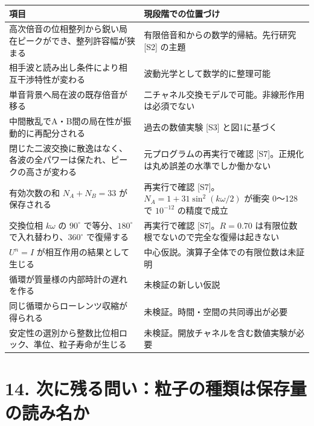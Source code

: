 \documentclass[
  a4paper,
]{ltjsarticle}
\newcounter{none} %
\begin{document}
{\def\LTcaptype{none} %
\begin{longtable}[]{@{}
  >{\raggedright\arraybackslash}p{}
  >{\raggedright\arraybackslash}p{}@{}}
\toprule\noalign{}
\begin{minipage}[b]{\linewidth}\raggedright
項目
\end{minipage} & \begin{minipage}[b]{\linewidth}\raggedright
現段階での位置づけ
\end{minipage} \\
\midrule\noalign{}
\endhead
\bottomrule\noalign{}
\endlastfoot
高次倍音の位相整列から鋭い局在ピークができ、整列許容幅が狭まる &
有限倍音和からの数学的帰結。先行研究 {[}S2{]} の主題 \\
相手波と読み出し条件により相互干渉特性が変わる &
波動光学として数学的に整理可能 \\
単音背景へ局在波の既存倍音が移る &
二チャネル交換モデルで可能。非線形作用は必須でない \\
中間散乱でA・B間の局在性が振動的に再配分される & 過去の数値実験 {[}S3{]}
と図1に基づく \\
閉じた二波交換に散逸はなく、各波の全パワーは保たれ、ピークの高さが変わる
& 元プログラムの再実行で確認
{[}S7{]}。正規化は丸め誤差の水準でしか働かない \\
有効次数の和 \(N_A+N_B=33\) が保存される & 再実行で確認
{[}S7{]}。\(N_A=1+31\sin^2(k\omega/2)\) が衝突 0〜128 で \(10^{-12}\)
の精度で成立 \\
交換位相 \(k\omega\) の \(90^\circ\) で等分、\(180^\circ\)
で入れ替わり、\(360^\circ\) で復帰する & 再実行で確認
{[}S7{]}。\(R=0.70\) は有限位数根でないので完全な復帰は起きない \\
\(U^n=I\) が相互作用の結果として生じる &
中心仮説。演算子全体での有限位数は未証明 \\
循環が質量様の内部時計の遅れを作る & 未検証の新しい仮説 \\
同じ循環からローレンツ収縮が得られる &
未検証。時間・空間の共同導出が必要 \\
安定性の選別から整数比位相ロック、準位、粒子寿命が生じる &
未検証。開放チャネルを含む数値実験が必要 \\
\end{longtable}
}

\section{14.
次に残る問い：粒子の種類は保存量の読み名か}\label{ux6b21ux306bux6b8bux308bux554fux3044ux7c92ux5b50ux306eux7a2eux985eux306fux4fddux5b58ux91cfux306eux8aadux307fux540dux304b}
\end{document}
